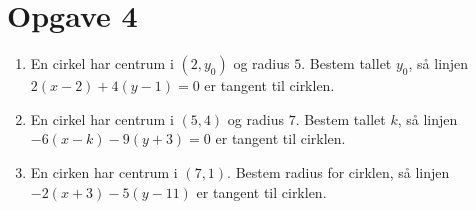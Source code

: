 \section*{Opgave 4}
\begin{enumerate}[label=\roman*)]
	\item En cirkel har centrum i $(2,y_0)$ og radius $5$. Bestem tallet $y_0$, så linjen $2(x-2) + 4(y-1) = 0$ 
	er tangent til cirklen.
	\item En cirkel har centrum i $(5,4)$ og radius $7$. Bestem tallet $k$, så linjen $-6(x-k)-9(y+3) = 0$ er 
	tangent til cirklen.
	\item En cirken har centrum i $(7,1)$. Bestem radius for cirklen, så linjen $-2(x+3)-5(y-11)$ er tangent
	til cirklen. 
\end{enumerate}
